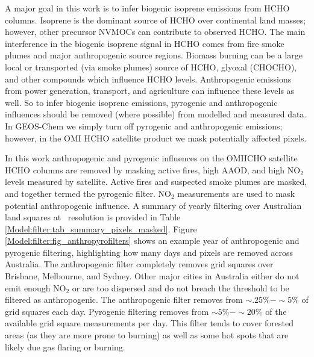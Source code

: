   A major goal in this work is to infer biogenic isoprene emissions from HCHO columns.
  Isoprene is the dominant source of HCHO over continental land masses; however, other precursor NVMOCs can contribute to observed HCHO.
  The main interference in the biogenic isoprene signal in HCHO comes from fire smoke plumes and major anthropogenic source regions.
  Biomass burning can be a large local or transported (via smoke plumes) source of HCHO, glyoxal (CHOCHO), and other compounds which influence HCHO levels.
  Anthropogenic emissions from power generation, transport, and agriculture can influence these levels as well.
  So to infer biogenic isoprene emissions, pyrogenic and anthropogenic influences should be removed (where possible) from modelled and measured data.
  In GEOS-Chem we simply turn off pyrogenic and anthropogenic emissions; however, in the OMI HCHO satellite product we mask potentially affected pixels.
  
  
  In this work anthropogenic and pyrogenic influences on the OMHCHO satellite HCHO columns are removed by masking active fires, high AAOD, and high NO$_2$ levels measured by satellite.
  Active fires and suspected smoke plumes are masked, and together termed the pyrogenic filter.
  NO$_2$ measurements are used to mask potential anthropogenic influence.  
  A summary of yearly filtering over Australian land squares at \highhr ~resolution is provided in Table \ref{Model:filter:tab_summary_pixels_masked}.
  Figure \ref{Model:filter:fig_anthropyrofilters} shows an example year of anthropogenic and pyrogenic filtering, highlighting how many days and pixels are removed across Australia.
  The anthropogenic filter completely removes grid squares over Brisbane, Melbourne, and Sydney. 
  Other major cities in Australia either do not emit enough NO$_2$ or are too dispersed and do not breach the threshold to be filtered as anthropogenic.
  The anthropogenic filter removes from $\sim .25\% - \sim5\%$ of grid squares each day.
  Pyrogenic filtering removes from $\sim 5\% - \sim 20\%$ of the available grid square measurements per day.
  This filter tends to cover forested areas (as they are more prone to burning) as well as some hot spots that are likely due gas flaring or burning.
  

